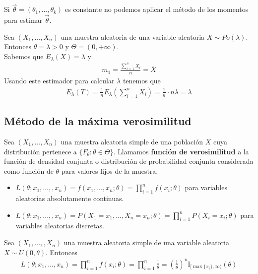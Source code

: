 \begin{obs}
Si $\overrightarrow{\theta} =(\theta_1,...,\theta_k)$ es constante no podemos aplicar el método de los momentos para estimar $\overrightarrow{\theta}$.
\end{obs}

\begin{ejemplo}
Sea $(X_1,...,X_n)$ una muestra aleatoria de una variable aleatoria $X \sim Po(\lambda)$. Entonces $\theta = \lambda >0$ y $\Theta = (0,+\infty)$.
\\
\newline
Sabemos que $E_{\lambda}(X) = \lambda$ y 
\begin{align*}
    m_1 = \frac{\sum_{i=1}^{n}{X_i}}{n} = \overline{X}
\end{align*}
Usando este estimador para calcular $\lambda$ tenemos que
\begin{align*}
    E_{\lambda}(T) = \frac{1}{n}{E_{\lambda}{\left( \sum_{i=1}^{n}{X_i}\right)}} = \frac{1}{n} \cdot n\lambda = \lambda
\end{align*}
\end{ejemplo}

\subsection{Método de la máxima verosimilitud}

\begin{defi}
Sea $(X_1,...,X_n)$ una muestra aleatoria simple de una población $X$ cuya distribución pertenece a $\{F_{\theta} : \theta \in \Theta \}$. Llamamos \textbf{función de verosimilitud }a la función de densidad conjunta o distribución de probabilidad conjunta considerada como función de $\theta$ para valores fijos de la muestra.
\begin{itemize}
    \item $L(\theta;x_1,...,,x_n) = f(x_1,...,x_n;\theta) = \prod_{i=1}^{n}{f(x_i;\theta)}$ para variables aleatorias absolutamente continuas.
    \item $L(\theta;x_1,...,,x_n) = P(X_1 = x_1,...,X_n = x_n;\theta) = \prod_{i=1}^{n}{P(X_i = x_i;\theta)}$ para variables aleatorias discretas.
\end{itemize}
\end{defi}

\begin{ejemplo}
Sea $(X_1,...,,X_n)$ una muestra aleatoria simple de una variable aleatoria $X \sim U(0,\theta)$. Entonces
\begin{align*}
    L(\theta;x_1,...,x_n) = \prod_{i=1}^{n}{f(x_i;\theta)} = \prod_{i=1}^{n}{\frac{1}{\theta}} = \left( \frac{1}{\theta}\right)^n  \text{I}_{[\max{\{x_i\}},\infty)}(\theta)
\end{align*}
\end{ejemplo}

